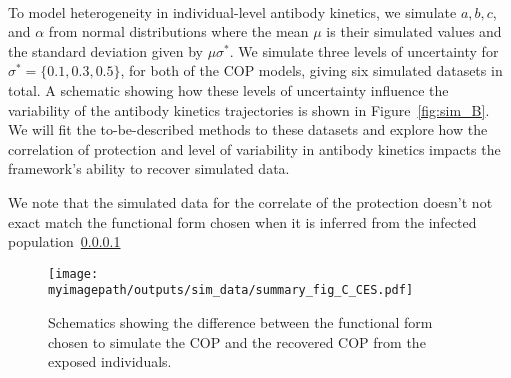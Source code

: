 \paragraph{}To model heterogeneity in individual-level antibody kinetics, we simulate $a, b, c$, and $\alpha$ from normal distributions where the mean $\mu$ is their simulated values and the standard deviation given by $\mu\sigma^*$. We simulate three levels of uncertainty for $\sigma^* = \{0.1, 0.3, 0.5\}$, for both of the COP models, giving six simulated datasets in total. A schematic showing how these levels of uncertainty influence the variability of the antibody kinetics trajectories is shown in Figure~\ref{fig:sim_B}. We will fit the to-be-described methods to these datasets and explore how the correlation of protection and level of variability in antibody kinetics impacts the framework's ability to recover simulated data. 



We note that the simulated data for the correlate of the protection doesn't not exact match the functional form chosen when it is inferred from the infected population~\ref{}

\begin{figure}[h]
    \centering
    \texttt{[image: \\myimagepath/outputs/sim\_data/summary\_fig\_C\_CES.pdf]}     \caption{Schematics showing the difference between the functional form chosen to simulate the COP and the recovered COP from the exposed individuals.   }
    \label{fig:sim_C}
\end{figure}


